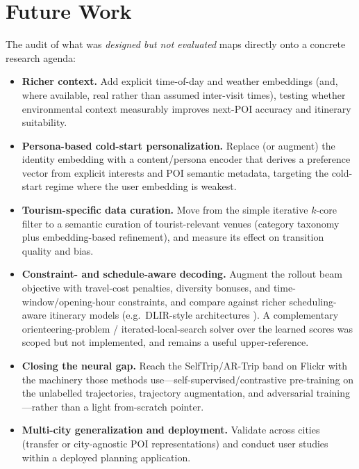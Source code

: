 \section{Future Work}
\label{sec:conc-future}

The audit of what was \emph{designed but not evaluated} maps directly onto a concrete research
agenda:

\begin{itemize}
  \item \textbf{Richer context.} Add explicit time-of-day and weather embeddings (and, where
  available, real rather than assumed inter-visit times), testing whether environmental context
  measurably improves next-POI accuracy and itinerary suitability.

  \item \textbf{Persona-based cold-start personalization.} Replace (or augment) the identity
  embedding with a content/persona encoder that derives a preference vector from explicit
  interests and POI semantic metadata, targeting the cold-start regime where the user embedding
  is weakest.

  \item \textbf{Tourism-specific data curation.} Move from the simple iterative $k$-core filter
  to a semantic curation of tourist-relevant venues (category taxonomy plus embedding-based
  refinement), and measure its effect on transition quality and bias.

  \item \textbf{Constraint- and schedule-aware decoding.} Augment the rollout beam objective
  with travel-cost penalties, diversity bonuses, and time-window/opening-hour constraints, and
  compare against richer scheduling-aware itinerary models (e.g.\ DLIR-style architectures
  \cite{halder2025drlir}). A complementary orienteering-problem / iterated-local-search solver
  over the learned scores was scoped but not implemented, and remains a useful upper-reference.

  \item \textbf{Closing the neural gap.} Reach the SelfTrip/AR-Trip band on Flickr with the
  machinery those methods use---self-supervised/contrastive pre-training on the unlabelled
  trajectories, trajectory augmentation, and adversarial training---rather than a light
  from-scratch pointer.

  \item \textbf{Multi-city generalization and deployment.} Validate across cities (transfer or
  city-agnostic POI representations) and conduct user studies within a deployed planning
  application.
\end{itemize}

